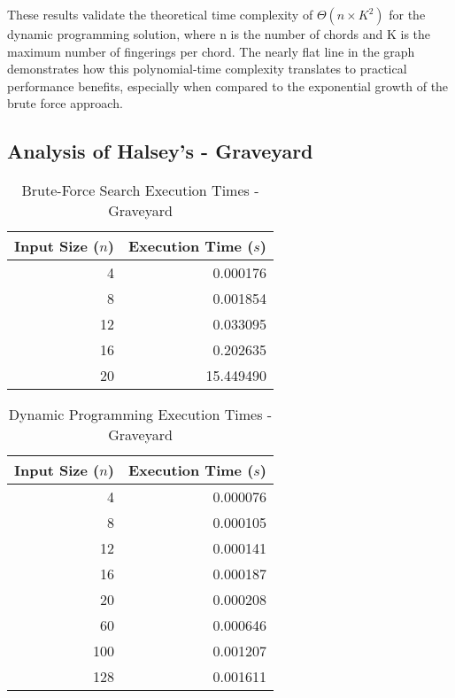 \documentclass[conference]{IEEEtran}
\begin{document}
These results validate the theoretical time complexity of \(\Theta(n \times K^2)\) for the dynamic programming solution, where n is the number of chords and K is the maximum number of fingerings per chord. The nearly flat line in the graph demonstrates how this polynomial-time complexity translates to practical performance benefits, especially when compared to the exponential growth of the brute force approach.

\subsection{Analysis of Halsey's - Graveyard}
\begin{table}[H]
    \centering 
    \caption{Brute-Force Search Execution Times - Graveyard}
    \renewcommand{\arraystretch}{1.2} %
    \setlength{\tabcolsep}{3pt} %
    \begin{tabular}{r r}
        \toprule 
        \textbf{Input Size ($n$)} & \textbf{Execution Time ($s$)} \\
        \midrule 
        4 & 0.000176 \\
        8 & 0.001854 \\
        12 & 0.033095\\
        16 & 0.202635 \\
        20 & 15.449490 \\
        \bottomrule
    \end{tabular}
\end{table}
\begin{table}[H]
    \centering
    \caption{Dynamic Programming Execution Times - Graveyard}
    \renewcommand{\arraystretch}{1.2} %
    \setlength{\tabcolsep}{3pt} %
    \begin{tabular}{r r}
        \toprule 
        \textbf{Input Size ($n$)} & \textbf{Execution Time ($s$)} \\
        \midrule 
        4 & 0.000076 \\ 
        8 & 0.000105 \\
        12 & 0.000141 \\
        16 & 0.000187 \\
        20 & 0.000208 \\
        60 & 0.000646 \\
        100 & 0.001207 \\
        128 & 0.001611 \\
        \bottomrule
    \end{tabular}
\end{table}
\end{document}
